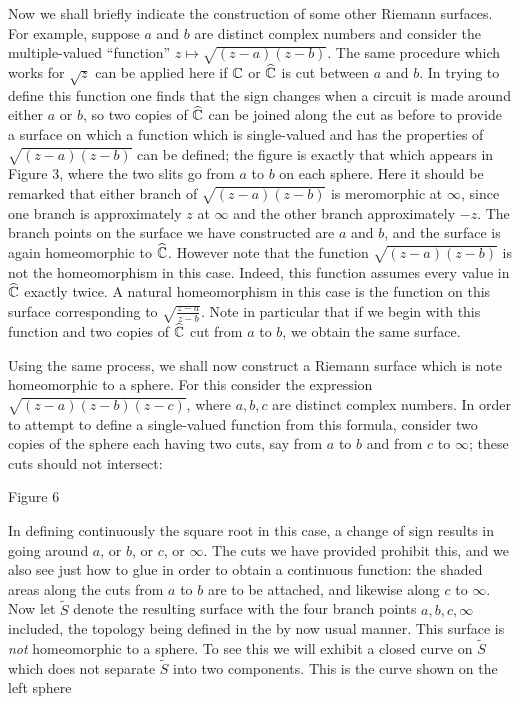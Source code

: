 \documentclass[a4paper,11pt]{article}
\begin{document}
Now we shall briefly indicate the construction of some other Riemann
surfaces.  For example, suppose $a$ and $b$ are distinct complex
numbers and consider the multiple-valued ``function'' $z \mapsto
\sqrt{(z-a)(z-b)}$.  The same procedure which works for $\sqrt{z}$ can
be applied here if ${\mathbb C}$ or $\widehat{{\mathbb C}}$ is cut between $a$ and
$b$. In trying to define this function one finds that the sign changes
when a circuit is made around either $a$ or $b$, so two copies of
$\widehat{{\mathbb C}}$ can be joined along the cut as before to provide a
surface on which a function which is single-valued and has the
properties of $\sqrt{(z-a)(z-b)}$ can be defined; the figure is
exactly that which appears in Figure 3, where the two slits go
from $a$ to $b$ on each sphere.  Here it should be remarked that
either branch of $\sqrt{(z-a)(z-b)}$ is meromorphic at $\infty$, since
one branch is approximately $z$ at $\infty$ and the other branch
approximately $-z$.  The branch points on the surface we have
constructed are $a$ and $b$, and the surface is again homeomorphic to
$\widehat{{\mathbb C}}$.  However note that the function $\sqrt{(z-a)(z-b)}$
is not the homeomorphism in this case.  Indeed, this function assumes
every value in $\widehat{{\mathbb C}}$ exactly twice.  A natural
homeomorphism in this case is the function on this surface
corresponding to $\sqrt{\frac{z-a}{z-b}}$.  Note in particular that if
we begin with this function and two copies of $\widehat{{\mathbb C}}$ cut
from $a$ to $b$, we obtain the same surface.

Using the same process, we shall now construct a Riemann surface which
is note homeomorphic to a sphere.  For this consider the expression
$\sqrt{(z-a)(z-b)(z-c)}$, where $a,b,c$ are distinct complex numbers.
In order to attempt to define a single-valued function from this
formula, consider two copies of the sphere each having two cuts, say
from $a$ to $b$ and from $c$ to $\infty$; these cuts should not
intersect:

\begin{mdframed}
  \vspace{3.5cm}

  Figure 6
\end{mdframed}

In defining continuously the square root in this case, a change of
sign results in going around $a$, or $b$, or $c$, or $\infty$.  The
cuts we have provided prohibit this, and we also see just how to glue
in order to obtain a continuous function: the shaded areas along the
cuts from $a$ to $b$ are to be attached, and likewise along $c$ to
$\infty$.  Now let $\widetilde{S}$ denote the resulting surface with
the four branch points $a, b, c, \infty$ included, the topology being
defined in the by now usual manner.  This surface is \emph{not}
homeomorphic to a sphere.  To see this we will exhibit a closed curve
on $\widetilde{S}$ which does not separate $\widetilde{S}$ into two
components.  This is the curve shown on the left sphere
\end{document}
